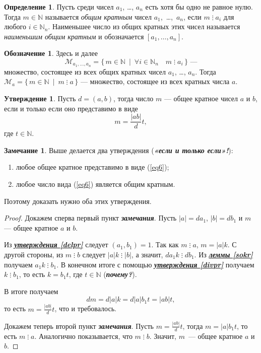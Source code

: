 \documentclass[14pt, a4paper]{extarticle}
\theoremstyle{definition}
\newtheorem*{definition}{Определение}
\newtheorem*{remark}{Замечание}
\newtheorem*{desig}{Обозначение}
\newtheorem{statement}{Утверждение}
\newcommand{\divisible}{\mathop{\vdots}}
\begin{document}
	\begin{definition}
		Пусть среди чисел $a_1$, \dots, $a_n$ есть хотя бы одно не равное нулю. Тогда $m\in\mathbb{N}$ называется \emph{общим кратным} чисел \mbox{$a_1$, \dots, $a_n$}, если $m\divisible a_i$ для любого $i\in\mathbb{N}_n$. Наименьшее число из общих кратных этих чисел называется \emph{наименьшим общим кратным} и обозначается $[a_1,\dots,a_n]$.
	\end{definition}
	
	\begin{desig}
		Здесь и далее $$\mathcal{M}_{a_1,\dots,a_n}=\{\,m\in\mathbb{N}\:\mid\:\forall i\in\mathbb{N}_n\quad m\divisible a_i\,\}\text{ ---}$$ множество, состоящее из всех общих кратных чисел $a_1$, \dots, $a_n$. Тогда $\mathcal{M}_a=\{\,m\in\mathbb{N}\:\mid\:m\divisible a\,\}$ --- множество, состоящее из всех кратных числа $a$.
	\end{desig}

	\begin{statement}
		Пусть $d=(a,b)$, тогда число $m$ --- общее кратное чисел $a$ и $b$, если и только если оно представимо в виде
		\begin{equation}
		\label{eq6}
			m=\frac{|ab|}{d}t,
		\end{equation}
		где $t\in\mathbb{N}$.
	\end{statement}
	\begin{remark}
		Выше делается два утверждения (\textbf{\textit{«если и только если»!}}):
		\begin{enumerate}[topsep=0pt,itemsep=-1ex,partopsep=1ex,parsep=1ex]
			\item любое общее кратное представимо в виде (\ref{eq6});
			\item любое число вида (\ref{eq6}) является общим кратным.
		\end{enumerate}
		Поэтому доказать нужно оба этих утверждения.
	\end{remark}
	\begin{proof}
		Докажем сперва первый пункт \textbf{\textit{замечания}}. Пусть $|a|=da_1$, $|b|=db_1$ и $m$ --- общее кратное $a$ и $b$.
		
		Из \hyperref[delpr]{\textbf{\textit{утверждения \ref*{delpr}}}} следует $(a_1,b_1)=1$. Так как $m\divisible a$, $m=|a|k$. С другой стороны, из $m\divisible b$ следует $|a|k\divisible|b|$, а значит, $da_1k\divisible db_1$. Из \hyperref[sokr]{\textbf{\textit{леммы \ref*{sokr}}}} получаем $a_1k\divisible b_1$. В конечном итоге с помощью \hyperref[divpr]{\textbf{\textit{утверждения \ref*{divpr}}}} получаем $k\divisible b_1$, то есть $k=b_1t$, где $t\in\mathbb{N}$ (\textbf{\textit{почему?}}).
		
		В итоге получаем $$dm=d|a|k=d|a|b_1t=|ab|t,$$ то есть $m=\frac{|ab|}{d}t$, что и требовалось.
		
		Докажем теперь второй пункт \textbf{\textit{замечания}}. Пусть $m=\frac{|ab|}{d}t$, тогда $m=|a|b_1t$, то есть $m\divisible a$. Аналогично показывается, что $m\divisible b$. Значит, $m$~--- общее кратное $a$ и $b$.
	\end{proof}
	
\end{document}
